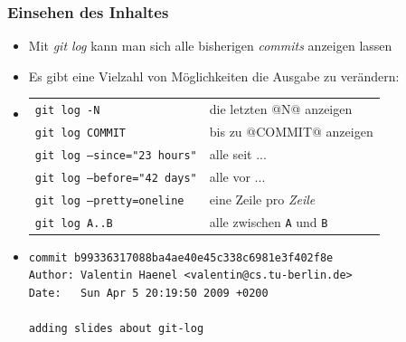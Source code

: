 \documentclass{beamer}
\begin{document}
\begin{frame}[fragile]
\frametitle{Einsehen des Inhaltes}

\begin{itemize}
    \item Mit \emph{git log} kann man sich alle bisherigen \textit{commits} anzeigen lassen
    \item Es gibt eine Vielzahl von Möglichkeiten die Ausgabe zu verändern:

\hspace{0.5cm}

    \item
\begin{tabular}{ l l }
{\tt git log -N}                            & die letzten @N@ anzeigen\\
{\tt git log COMMIT}                        & bis zu @COMMIT@ anzeigen \\
{\tt git log --since="23 hours"}            & alle seit ... \\
{\tt git log --before="42 days"}            & alle vor ... \\
{\tt git log --pretty=oneline}              & eine Zeile pro \textit{Zeile} \\
{\tt git log A..B}                          & alle zwischen {\tt A} und {\tt B}
\end{tabular}

\hspace{0.5cm}

\item{

\begin{verbatim}
commit b99336317088ba4ae40e45c338c6981e3f402f8e
Author: Valentin Haenel <valentin@cs.tu-berlin.de>
Date:   Sun Apr 5 20:19:50 2009 +0200

adding slides about git-log
\end{verbatim}

}

\end{itemize}

\end{frame}


\end{document}
